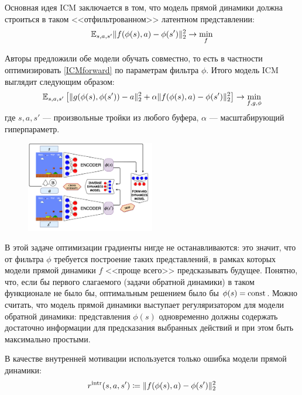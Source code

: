 Основная идея ICM заключается в том, что модель прямой динамики должна строиться в таком <<отфильтрованном>> латентном представлении:
\begin{equation}\label{ICMforward}
\mathbb{E}_{s, a, s'} \|f(\phi(s), a) - \phi(s')\|^2_2 \to \min_{f}
\end{equation}

Авторы предложили обе модели обучать совместно, то есть в частности оптимизировать \eqref{ICMforward} по параметрам фильтра $\phi$. Итого модель ICM выглядит следующим образом:
$$\mathbb{E}_{s, a, s'} \left[ \|g(\phi(s), \phi(s')) - a\|^2_2 + \alpha \|f(\phi(s), a) - \phi(s')\|^2_2 \right] \to \min_{f, g, \phi}$$
где $s, a, s'$ --- произвольные тройки из любого буфера, $\alpha$ --- масштабирующий гиперпараметр. 

\begin{figure}
\vspace{-0.4cm}
\centering
\includegraphics[width=0.5\textwidth]{Images/ICM.png}
\vspace{-0.5cm}
\end{figure}

В этой задаче оптимизации градиенты нигде не останавливаются: это значит, что от фильтра $\phi$ требуется построение таких представлений, в рамках которых модели прямой динамики $f$ <<проще всего>> предсказывать будущее. Понятно, что, если бы первого слагаемого (задачи обратной динамики) в таком функционале не было бы, оптимальным решением было бы $\phi(s) \HM= \const$. Можно считать, что модель прямой динамики выступает регуляризатором для модели обратной динамики: представления $\phi(s)$ одновременно должны содержать достаточно информации для предсказания выбранных действий и при этом быть максимально простыми.

В качестве внутренней мотивации используется только ошибка модели прямой динамики:
\begin{equation*}
r^{\mathrm{intr}}(s, a, s') \coloneqq \|f(\phi(s), a) - \phi(s')\|^2_2
\end{equation*}

